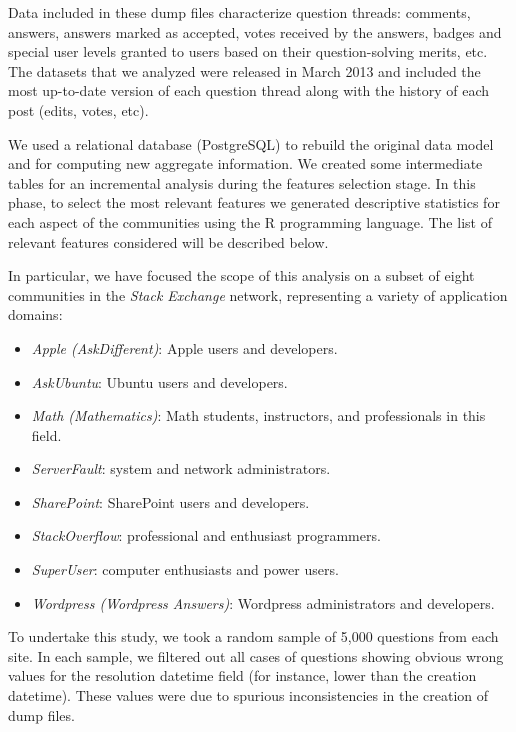\documentclass{chi2012}
\begin{document}
Data included in these dump files characterize question threads: comments, answers, answers marked as accepted, votes received by the answers, badges 
and special user levels granted to users based on their question-solving merits, etc.
The datasets that we analyzed were released in March 2013 and included the most up-to-date version
of each question thread along with the history of each post (edits, votes, etc). 

We used a relational database (PostgreSQL) to rebuild the original data model and 
for computing new aggregate information. We created some intermediate tables for 
an incremental analysis during the features selection stage. In this phase, to select 
the most relevant features we generated descriptive statistics for each aspect of the
communities using the R programming language. The list of relevant features considered
will be described below.

In particular, we have focused the scope of this analysis on a subset of eight communities in the \textit{Stack Exchange} network, representing a variety of application domains:

\begin{itemize}

	\item \textit{Apple (AskDifferent)}: Apple users and developers.
    \item \textit{AskUbuntu}: Ubuntu users and developers.
    \item \textit{Math (Mathematics)}: Math students, instructors, and 
    professionals  in this field.
    \item \textit{ServerFault}: system and network administrators.
    \item \textit{SharePoint}: SharePoint users and developers.
    \item \textit{StackOverflow}: professional and enthusiast programmers.
    \item \textit{SuperUser}: computer enthusiasts and power users.
    \item \textit{Wordpress (Wordpress Answers)}: Wordpress administrators and developers.

\end{itemize}

To undertake this study, we took a random sample of 5,000 questions from each site.
In each sample, we filtered out all cases of questions showing obvious wrong values for 
the resolution datetime field (for instance, lower than the creation datetime). These 
values were due to spurious inconsistencies in the creation of dump files.
\end{document}
